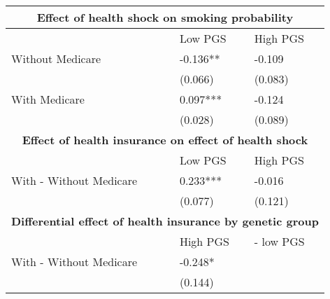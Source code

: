% 
\begin{tabular}{lll}
  \toprule
  \multicolumn{3}{c}{ \textbf{Effect of health shock on smoking probability}} \\
 \midrule
 & Low PGS & High PGS \\ 
   \midrule
Without Medicare & -0.136** & -0.109 \\ 
   & (0.066) & (0.083) \\ 
  With Medicare & 0.097*** & -0.124 \\ 
   & (0.028) & (0.089) \\ 
   \toprule \multicolumn{3}{c}{ \textbf{Effect of health insurance on effect of health shock}} \\
 \midrule
 & Low PGS & High PGS \\ 
   \midrule
With - Without Medicare & 0.233*** & -0.016 \\ 
   & (0.077) & (0.121) \\ 
   \toprule \multicolumn{3}{c}{ \textbf{Differential effect of health insurance by genetic group}} \\
 \midrule
 & High PGS  & - low PGS \\ 
   \midrule
With - Without Medicare & -0.248* &  \\ 
   & (0.144) &  \\ 
  \end{tabular}
